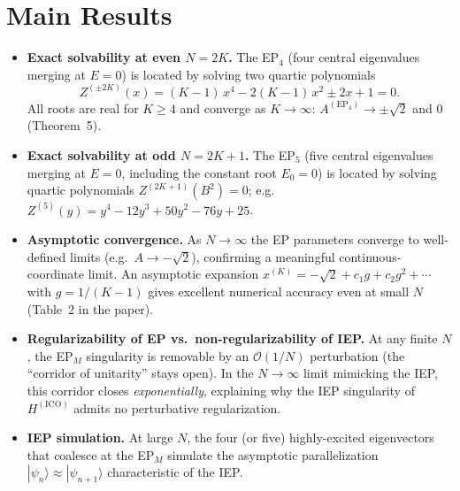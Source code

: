 \documentclass[11pt,a4paper]{article}
\begin{document}
\section{Main Results}

\begin{itemize}[leftmargin=1.5em]
  \item \textbf{Exact solvability at even $N=2K$.}
    The EP$_4$ (four central eigenvalues merging at $E=0$) is located by solving two quartic polynomials
    \[
      Z^{(\pm 2K)}(x) = (K{-}1)\,x^4 - 2(K{-}1)\,x^2 \pm 2x + 1 = 0.
    \]
    All roots are real for $K \ge 4$ and converge as $K \to \infty$:
    $A^{(\mathrm{EP}_4)} \to \pm\sqrt{2}$ and $0$ (Theorem~5).

  \item \textbf{Exact solvability at odd $N=2K+1$.}
    The EP$_5$ (five central eigenvalues merging at $E=0$, including the constant root $E_0=0$) is located by solving quartic polynomials $Z^{(2K+1)}(B^2) = 0$; e.g.\
    $Z^{(5)}(y) = y^4 - 12y^3 + 50y^2 - 76y + 25$.

  \item \textbf{Asymptotic convergence.}
    As $N \to \infty$ the EP parameters converge to well-defined limits (e.g.\ $A \to -\sqrt{2}$), confirming a meaningful continuous-coordinate limit.
    An asymptotic expansion $x^{(K)} = -\sqrt{2} + c_1 g + c_2 g^2 + \cdots$ with $g = 1/(K{-}1)$ gives excellent numerical accuracy even at small $N$ (Table~2 in the paper).

  \item \textbf{Regularizability of EP vs.\ non-regularizability of IEP.}
    At any finite $N$, the EP$_M$ singularity is removable by an $\mathcal{O}(1/N)$ perturbation (the ``corridor of unitarity'' stays open).
    In the $N \to \infty$ limit mimicking the IEP, this corridor closes \emph{exponentially}, explaining why the IEP singularity of $H^{(\mathrm{ICO})}$ admits no perturbative regularization.

  \item \textbf{IEP simulation.}
    At large $N$, the four (or five) highly-excited eigenvectors that coalesce at the EP$_M$ simulate the asymptotic parallelization $|\psi_n\rangle \approx |\psi_{n+1}\rangle$ characteristic of the IEP.
\end{itemize}

\end{document}
